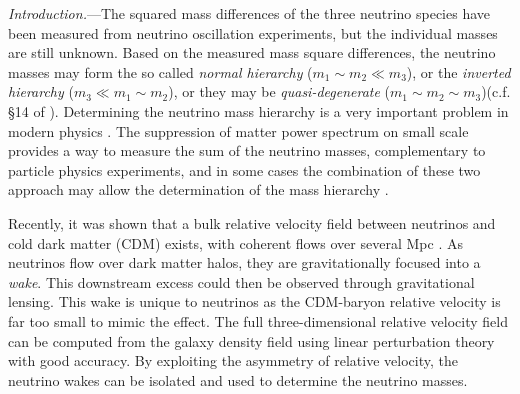 \documentclass[aps,prl,twocolumn,showpacs,superscriptaddress,groupedaddress,nofootinbib]{revtex4}  %
\begin{document}
{\it Introduction.}---The squared mass differences of the three neutrino species 
have been measured from neutrino oscillation experiments, but 
the individual masses are still unknown. Based on the measured mass square 
differences, the neutrino masses may form the so called {\it normal 
hierarchy} ($m_1 \sim m_2 \ll m_3$), or the {\it inverted 
hierarchy} ($m_3 \ll m_1 \sim m_2$), or  they may be {\it quasi-degenerate} 
($m_1 \sim m_2 \sim m_3$)(c.f. \S 14 of \cite{2014ChPhC..38i0001O}). 
Determining the neutrino mass hierarchy is a very
important problem in modern physics \cite{2013arXiv1307.5487C}. 
The suppression of matter power spectrum on small scale  
provides a way to measure the sum of the neutrino 
masses\cite{Bond:1980,Hu:1997}, complementary 
to particle physics experiments, and in some cases 
the combination of these two approach may
allow the determination of the mass hierarchy \cite{Dodelson:2014}. 


Recently, it was shown that  a bulk relative velocity field between 
neutrinos and cold dark matter (CDM)
exists, with coherent flows over several Mpc \cite{Zhu:2013}.
As neutrinos flow over dark matter halos, they are gravitationally focused
into a {\it wake}.  This downstream excess could then be observed
through gravitational lensing. This wake is unique to
neutrinos as the CDM-baryon relative velocity is far too small to
mimic the effect.  The full three-dimensional relative velocity field can be
computed from the galaxy density field using linear perturbation 
theory with good accuracy.
By exploiting the asymmetry of relative velocity, the neutrino wakes
can be isolated and used to determine the neutrino masses.
\end{document}
